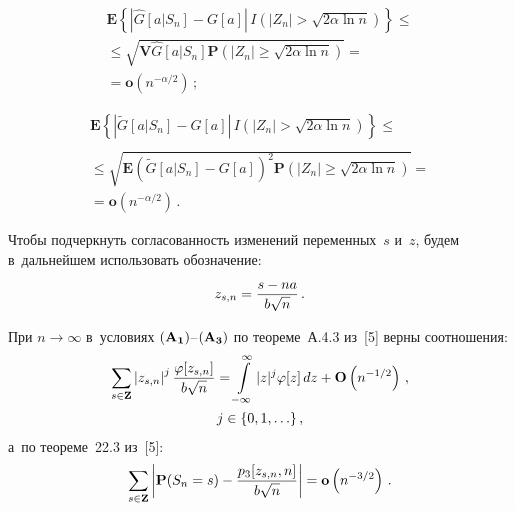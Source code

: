 \begin{multicols}{2}
 \vspace*{-12pt}
 
 \noindent
 \begin{multline}
 \mathbf{E} \left\{\left|\widehat{G}[a|S_n]-G[a]\right|
 \, I\left(|Z_n|>\sqrt{2\alpha\ln n}\right)\right\}\le{} 
\\ 
 \le\sqrt{\mathbf{V} \widehat{G}[a|S_n]
 \mathbf{P}\left( \left| {Z_n } \right| \ge \sqrt {2\alpha \ln n}\right)}
  ={}\\
  {}= \mathbf{o}\left(n^{-\alpha/2}\right)\,;
\label{e17-ch}
\end{multline}

 
 \vspace*{-12pt}
 
 \noindent
 \begin{multline}
 \mathbf{E} \left\{\left|\widetilde{G}[a|S_n]-G[a]\right|
 \, I\left(|Z_n|>\sqrt{2\alpha\ln n}\right)\right\}\le{}\\
\\
 {}\le\sqrt{\mathbf{E} \left(\widetilde{G}[a|S_n]-G[a]\right)^2
 \mathbf{P}\left( \left| {Z_n } \right| \ge \sqrt {2\alpha \ln n}\right)}
  = {}\\
  {}=\mathbf{o}\left(n^{-\alpha/2}\right)\,.
  \label{e18-ch}
 \end{multline}

 Чтобы подчеркнуть согласованность изменений переменных~$s$ и~$z$, 
 будем в~дальнейшем использовать обозначение:
 \begin{equation*}
 z_{s,n}=\displaystyle\frac{\displaystyle s-na\mathstrut}{\displaystyle b\sqrt{n}\mathstrut}\,.
 \end{equation*}

 При  $n\to\infty$ в~условиях ${\bf (A_1)}$--${\bf(A_3)}$ по теореме~А.4.3 из~[5]
 верны соотношения:
 \begin{multline}
 \sum\limits_{s\in \mathbf{Z}} 
 \left|z_{s,n}\right|^j \displaystyle\frac{\displaystyle \varphi[z_{s,n}]\mathstrut}{\displaystyle b\sqrt{n}\mathstrut}=
  \int\limits_{-\infty}^{\infty} |z|^j \varphi[z]\, dz+
\mathbf{O}
 \left(n^{-1/2}\right)\,,\\ j\in\{0,1,\ldots\}\,,
 \label{e19-ch}
 \end{multline}
 а~по теореме~22.3 из~[5]:
 \begin{equation}
 \sum\limits_{s\in \mathbf{Z}} \left|
 \mathbf{P}(S_n=s)-\displaystyle\frac{\displaystyle p_3[z_{s,n},n]\mathstrut}{\displaystyle b\sqrt{n}\mathstrut}\right|
 =\mathbf{o}\left(n^{-3/2}\right)\,.
 \label{e20-ch}
 \end{equation}


\end{multicols}
